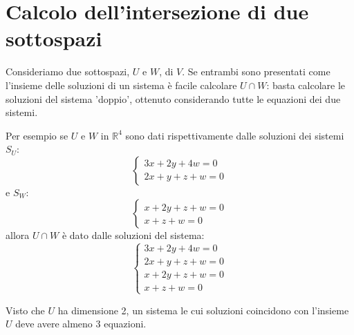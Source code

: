 \section{Calcolo dell'intersezione di due sottospazi}
Consideriamo due sottospazi, $U$ e $W$, di $V$. Se entrambi sono presentati
come l'insieme delle soluzioni di un sistema \`e facile calcolare $U \cap W$:
basta calcolare le soluzioni del sistema 'doppio', ottenuto considerando tutte
le equazioni dei due sistemi.

Per esempio se $U$ e $W$ in $\mathbb{R}^4$ sono dati rispettivamente dalle
soluzioni dei sistemi $S_U$:
\begin{equation*}
	\begin{cases}
		3x + 2y + 4w = 0 \\
		2x + y + z + w = 0
	\end{cases}
\end{equation*}
e $S_W$:
\begin{equation*}
	\begin{cases}
		x + 2y + z + w = 0 \\
		x + z + w = 0
	\end{cases}
\end{equation*}
allora $U \cap W$ \`e dato dalle soluzioni del sistema:
\begin{equation*}
	\begin{cases}
		3x + 2y + 4w = 0   \\
		2x + y + z + w = 0 \\
		x + 2y + z + w = 0 \\
		x + z + w = 0
	\end{cases}
\end{equation*}

\begin{observation}
	Visto che $U$ ha dimensione 2, un sistema le cui soluzioni coincidono con
	l'insieme $U$ deve avere almeno 3 equazioni.
\end{observation}

